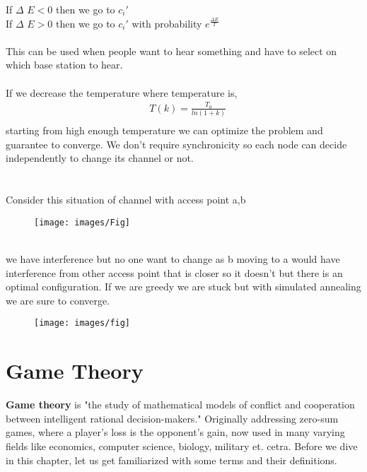 If $\Delta$ $E < 0$ then we go to $c_i'$ \\
If $\Delta$ $E > 0$ then we go to $c_i'$ with probability $e^{\frac{\Delta E}{T}}$\\ \\
This can be used when people want to hear something and have to select on which base station to hear.\\ \\ 
If we decrease the temperature where temperature is, 
\begin{equation}
\begin{aligned}
&  T(k) = \frac{T_0}{ln(1+k)}\\
\end{aligned}
\end{equation}
starting from high enough temperature we can optimize the problem and guarantee to converge. We don't require synchronicity so each node can decide independently to change its channel or not. \\
\\ \\
Consider this situation of channel with access point a,b \\ 
\begin{figure} [ht!]
\centering
\texttt{[image: images/Fig]}
\end{figure}\\
 we have interference but no one want to change as b moving to a would have interference  from other access point that is closer so it doesn't 
 but there is an optimal configuration. 
 If we are greedy we are stuck 
 but with simulated annealing we are sure to converge. 
\begin{figure} [ht!]
\centering
\texttt{[image: images/fig]}
\end{figure} 

\section{Game Theory}
\textbf{Game theory} is "the study of mathematical models of conflict and cooperation between intelligent rational decision-makers." Originally addressing zero-sum games, where a player's loss is the opponent's gain, now used in many varying fields like economics, computer science, biology, military et. cetra. Before we dive in this chapter, let us get familiarized with some terms and their definitions.

